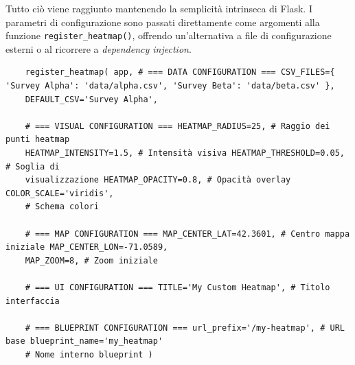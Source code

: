Tutto ciò viene raggiunto mantenendo la semplicità intrinseca di Flask. I
parametri di configurazione sono passati direttamente come argomenti alla
funzione \texttt{register\_heatmap()}, offrendo un'alternativa a file di
configurazione esterni o al ricorrere a \textit{dependency injection}.

\begin{listing}
  [H]
  \caption{Parametri di personalizzazione completa per la heatmap}
  \label{lst:full_customization_params}
  \begin{verbatim}
    register_heatmap( app, # === DATA CONFIGURATION === CSV_FILES={ 'Survey Alpha': 'data/alpha.csv', 'Survey Beta': 'data/beta.csv' },
    DEFAULT_CSV='Survey Alpha',

    # === VISUAL CONFIGURATION === HEATMAP_RADIUS=25, # Raggio dei punti heatmap
    HEATMAP_INTENSITY=1.5, # Intensità visiva HEATMAP_THRESHOLD=0.05, # Soglia di
    visualizzazione HEATMAP_OPACITY=0.8, # Opacità overlay COLOR_SCALE='viridis',
    # Schema colori

    # === MAP CONFIGURATION === MAP_CENTER_LAT=42.3601, # Centro mappa iniziale MAP_CENTER_LON=-71.0589,
    MAP_ZOOM=8, # Zoom iniziale

    # === UI CONFIGURATION === TITLE='My Custom Heatmap', # Titolo interfaccia

    # === BLUEPRINT CONFIGURATION === url_prefix='/my-heatmap', # URL base blueprint_name='my_heatmap'
    # Nome interno blueprint )
  \end{verbatim}
\end{listing}